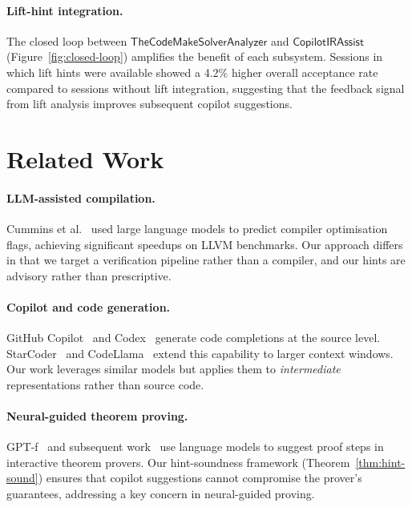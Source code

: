 \documentclass[11pt]{article}
\newcommand{\CIA}{\mathsf{CopilotIRAssist}}
\newcommand{\TCA}{\mathsf{TheCodeMakeSolverAnalyzer}}
\begin{document}
\paragraph{Lift-hint integration.}
The closed loop between $\TCA$ and $\CIA$
(Figure~\ref{fig:closed-loop}) amplifies the benefit of each
subsystem.  Sessions in which lift hints were available showed a 4.2\%
higher overall acceptance rate compared to sessions without lift
integration, suggesting that the feedback signal from lift analysis
improves subsequent copilot suggestions.

\section{Related Work}\label{sec:related}

\paragraph{LLM-assisted compilation.}
Cummins et al.~\cite{cummins2023large} used large language models to
predict compiler optimisation flags, achieving significant speedups on
LLVM benchmarks.  Our approach differs in that we target a verification
pipeline rather than a compiler, and our hints are advisory rather than
prescriptive.

\paragraph{Copilot and code generation.}
GitHub Copilot~\cite{github2021copilot} and
Codex~\cite{chen2021codex} generate code completions at the source
level.  StarCoder~\cite{li2023starcoder} and
CodeLlama~\cite{roziere2023codellama} extend this capability to larger
context windows.  Our work leverages similar models but applies them to
\emph{intermediate} representations rather than source code.

\paragraph{Neural-guided theorem proving.}
GPT-f~\cite{polu2020gptf} and subsequent
work~\cite{lample2022hypertree,jiang2022thor} use language models to
suggest proof steps in interactive theorem provers.  Our hint-soundness
framework (Theorem~\ref{thm:hint-sound}) ensures that copilot
suggestions cannot compromise the prover's guarantees, addressing a
key concern in neural-guided proving.
\end{document}
